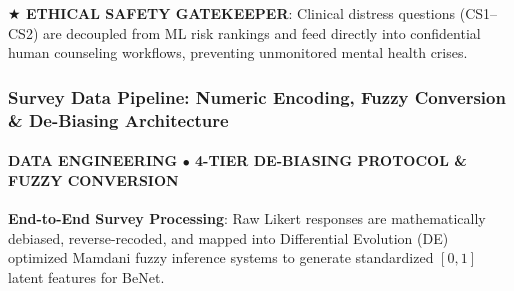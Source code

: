 \documentclass[aspectratio=169, 10pt]{beamer}
\begin{document}
\begin{frame}
  \begin{takeawaybanner}
    \textbf{\color{GoldPill}$\bigstar$ ETHICAL SAFETY GATEKEEPER}: Clinical distress questions (CS1--CS2) are decoupled from ML risk rankings and feed directly into confidential human counseling workflows, preventing unmonitored mental health crises.
  \end{takeawaybanner}
\end{frame}

\begin{frame}
  \frametitle{Survey Data Pipeline: Numeric Encoding, Fuzzy Conversion \& De-Biasing Architecture}
  \framesubtitle{DATA ENGINEERING $\bullet$ 4-TIER DE-BIASING PROTOCOL \& FUZZY CONVERSION}

  \begin{topsummarybar}
    \fontsize{6.5pt}{8pt}\selectfont
    \textbf{\color{NavyDark}End-to-End Survey Processing}: Raw Likert responses are mathematically debiased, reverse-recoded, and mapped into Differential Evolution (DE) optimized Mamdani fuzzy inference systems to generate standardized $[0, 1]$ latent features for BeNet.
  \end{topsummarybar}
  \vspace{-0.20cm}


\end{frame}
\end{document}
